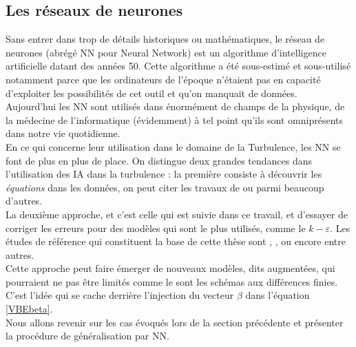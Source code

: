 \documentclass[a4paper,12pt]{article}
\newcommand{\keps}{$k-\varepsilon$}
\newcommand\bk{\color{black}}
\newcommand\brick{\color{brick}}
\numberwithin{equation}{section} %
\begin{document}
\brick \subsection{Les réseaux de neurones} \bk
Sans entrer dans trop de détails historiques ou mathématiques, le réseau de neurones (abrégé NN pour Neural Network) est un algorithme d'intelligence artificielle datant des années 50. Cette algorithme a été sous-estimé et sous-utilisé notamment parce que les ordinateurs de l'époque n'étaient pas en capacité d'exploiter les possibilités de cet outil et qu'on manquait de données.\\
Aujourd'hui les NN sont utilisés dans énormément de champs de la physique, de la médecine de l'informatique (évidemment) à tel point qu'ils sont omniprésents dans notre vie quotidienne.\\
En ce qui concerne leur utilisation dans le domaine de la Turbulence, les NN se font de plus en plus de place. On distingue deux grandes tendances dans l'utilisation des IA dans la turbulence : la première consiste à découvrir les \textit{équations} dans les données, on peut citer les travaux de \citep{kutz2017deep} ou \citep{raissi2018hidden} parmi beaucoup d'autres. \\
La deuxième approche, et c'est celle qui est suivie dans ce travail, et d'essayer de corriger les erreurs pour des modèles qui sont le plus utilisés, comme le \keps $ $. Les études de référence qui constituent la base de cette thèse sont \citep{parish2016paradigm}, \citep{singh2017machine}, \citep{wu2018data} ou encore \citep{wang2017physics} entre autres. \\
Cette approche peut faire émerger de nouveaux modèles, dits augmentées, qui pourraient ne pas être limités comme le sont les schémas aux différences finies. C'est l'idée qui se cache derrière l'injection du vecteur $\beta$ dans l'équation \eqref{VBEbeta}.\\

\noindent Nous allons revenir sur les cas évoqués lors de la section précédente et présenter la procédure de généralisation par NN.
\end{document}
